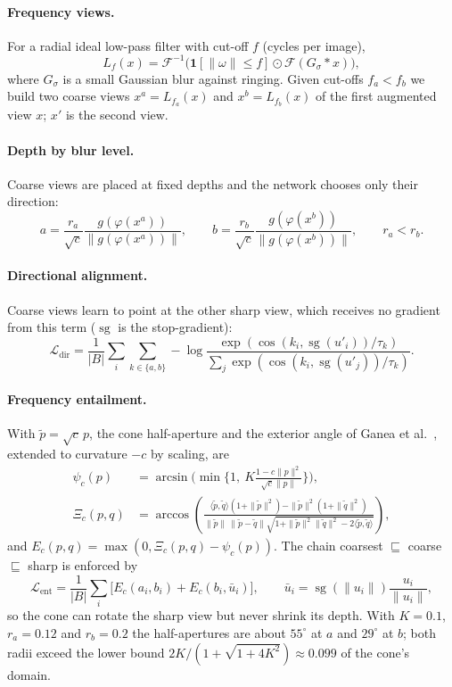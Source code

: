 \documentclass[10pt]{article}
\DeclareMathOperator{\sg}{sg}
\newcommand{\Lb}{\mathcal{L}}
\begin{document}
\paragraph{Frequency views.} For a radial ideal low-pass filter with cut-off $f$ (cycles per image),
\begin{equation}
L_f(x)=\mathcal{F}^{-1}\big(\mathbf{1}[\|\omega\|\le f]\odot\mathcal{F}(G_\sigma * x)\big),
\end{equation}
where $G_\sigma$ is a small Gaussian blur against ringing. Given cut-offs $f_a<f_b$ we build two coarse
views $x^a=L_{f_a}(x)$ and $x^b=L_{f_b}(x)$ of the first augmented view $x$; $x'$ is the second view.

\paragraph{Depth by blur level.} Coarse views are placed at fixed depths and the network chooses only
their direction:
\begin{equation}
a=\frac{r_a}{\sqrt{c}}\frac{g(\varphi(x^a))}{\|g(\varphi(x^a))\|},\qquad
b=\frac{r_b}{\sqrt{c}}\frac{g(\varphi(x^b))}{\|g(\varphi(x^b))\|},\qquad r_a<r_b .
\end{equation}

\paragraph{Directional alignment.} Coarse views learn to point at the other sharp view, which receives
no gradient from this term ($\sg$ is the stop-gradient):
\begin{equation}
\Lb_{\mathrm{dir}}=\frac{1}{|B|}\sum_{i}\sum_{k\in\{a,b\}}
-\log\frac{\exp(\cos(k_i,\sg(u'_i))/\tau_k)}{\sum_j \exp(\cos(k_i,\sg(u'_j))/\tau_k)} .
\end{equation}

\paragraph{Frequency entailment.} With $\tilde p=\sqrt{c}\,p$, the cone half-aperture and the exterior angle
of Ganea et al.~\cite{ganea2018cones}, extended to curvature $-c$ by scaling, are
\begin{align}
\psi_c(p)&=\arcsin\Big(\min\Big\{1,\ K\frac{1-c\|p\|^2}{\sqrt{c}\|p\|}\Big\}\Big),\\
\Xi_c(p,q)&=\arccos\left(\frac{\langle\tilde p,\tilde q\rangle(1+\|\tilde p\|^2)-\|\tilde p\|^2(1+\|\tilde q\|^2)}
{\|\tilde p\|\,\|\tilde p-\tilde q\|\sqrt{1+\|\tilde p\|^2\|\tilde q\|^2-2\langle\tilde p,\tilde q\rangle}}\right),
\end{align}
and $E_c(p,q)=\max(0,\Xi_c(p,q)-\psi_c(p))$. The chain coarsest $\sqsubseteq$ coarse $\sqsubseteq$ sharp is
enforced by
\begin{equation}
\Lb_{\mathrm{ent}}=\frac{1}{|B|}\sum_i\big[E_c(a_i,b_i)+E_c(b_i,\bar u_i)\big],\qquad
\bar u_i=\sg(\|u_i\|)\frac{u_i}{\|u_i\|},
\end{equation}
so the cone can rotate the sharp view but never shrink its depth. With $K=0.1$, $r_a=0.12$ and $r_b=0.2$ the
half-apertures are about $55^\circ$ at $a$ and $29^\circ$ at $b$; both radii exceed the lower bound
$2K/(1+\sqrt{1+4K^2})\approx0.099$ of the cone's domain.
\end{document}
